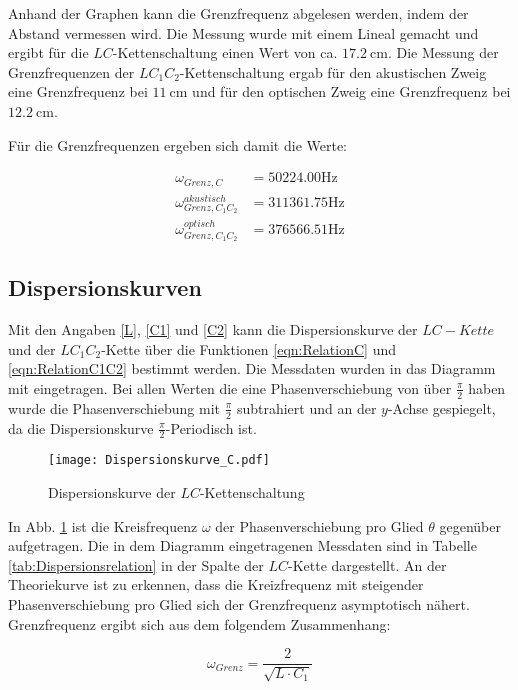 Anhand der Graphen kann die Grenzfrequenz abgelesen werden, indem der
Abstand vermessen wird. Die Messung wurde mit einem Lineal gemacht
und ergibt für die $LC$-Kettenschaltung einen Wert von ca.
$\SI{17,2}{\centi\meter}$. Die Messung der Grenzfrequenzen der
$LC_1C_2$-Kettenschaltung ergab für den akustischen Zweig eine
Grenzfrequenz bei $\SI{11}{\centi\meter}$ und für den optischen Zweig eine
Grenzfrequenz bei  $\SI{12,2}{\centi\meter}$.

Für die Grenzfrequenzen ergeben sich damit die Werte:

\begin{align}
  \omega_{Grenz,C} &= \num{50224,00}\si{\hertz}\\
  \omega_{Grenz,C_1C_2}^{akustisch} &= \num{311361,75}\si{\hertz}\\
  \omega_{Grenz,C_1C_2}^{optisch} &= \num{376566,51}\si{\hertz}
\end{align}

\subsection{Dispersionskurven}

Mit den Angaben \eqref{L}, \eqref{C1} und \eqref{C2} kann die Dispersionskurve
der $LC-Kette$ und der $LC_1C_2$-Kette über die Funktionen \eqref{eqn:RelationC}
und \eqref{eqn:RelationC1C2} bestimmt werden.
Die Messdaten wurden in das Diagramm mit eingetragen. Bei allen Werten die eine
Phasenverschiebung von über $\frac{\pi}{2}$ haben wurde die Phasenverschiebung
mit $\frac{\pi}{2}$ subtrahiert und an der $y$-Achse gespiegelt,
da die Dispersionskurve $\frac{\pi}{2}$-Periodisch ist.

\begin{figure}
  \texttt{[image: Dispersionskurve\_C.pdf]}
  \caption{Dispersionskurve der $LC$-Kettenschaltung}
  \label{fig:DispersionC}
\end{figure}

In Abb. \ref{fig:DispersionC} ist die Kreisfrequenz $\omega$ der Phasenverschiebung
pro Glied $\theta$ gegenüber aufgetragen. Die in dem Diagramm eingetragenen
Messdaten sind in Tabelle \ref{tab:Dispersionsrelation} in der Spalte
der $LC$-Kette dargestellt. An der Theoriekurve ist zu erkennen, dass die Kreizfrequenz
mit steigender Phasenverschiebung pro Glied sich der Grenzfrequenz asymptotisch
nähert. Grenzfrequenz ergibt sich aus dem folgendem Zusammenhang:

\begin{equation}
  \label{eqn:Grenzfrequenz}
  \omega_{Grenz} = \frac{2}{\sqrt{L\cdot C_1}}
\end{equation}

